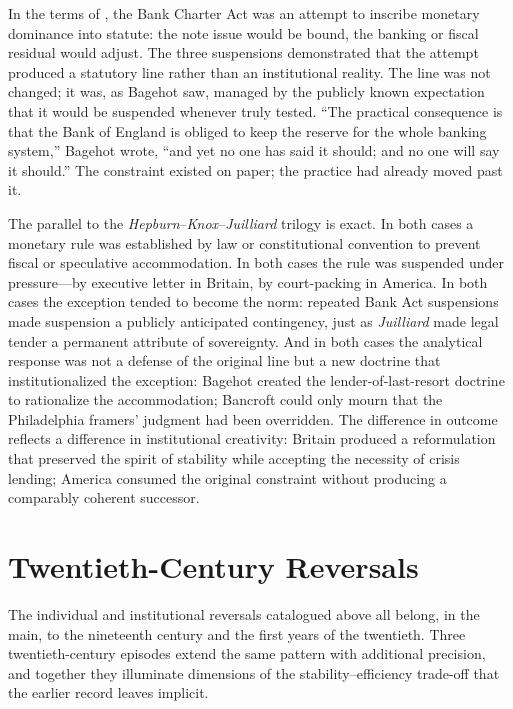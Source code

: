 \documentclass[12pt]{article}
\begin{document}
In the terms of \citet{Sargent2011}, the Bank Charter Act was an attempt
to inscribe monetary dominance into statute: the note issue would be
bound, the banking or fiscal residual would adjust.  The three
suspensions demonstrated that the attempt produced a statutory line
rather than an institutional reality.  The line was not changed; it was,
as Bagehot saw, managed by the publicly known expectation that it would
be suspended whenever truly tested.  ``The practical consequence is
that the Bank of England is obliged to keep the reserve for the whole
banking system,'' Bagehot wrote, ``and yet no one has said it should;
and no one will say it should.''  The constraint existed on paper; the
practice had already moved past it.

The parallel to the \textit{Hepburn}--\textit{Knox}--\textit{Juilliard}
trilogy is exact.  In both cases a monetary rule was established by law
or constitutional convention to prevent fiscal or speculative
accommodation.  In both cases the rule was suspended under pressure---by
executive letter in Britain, by court-packing in America.  In both cases
the exception tended to become the norm: repeated Bank Act suspensions
made suspension a publicly anticipated contingency, just as
\textit{Juilliard} made legal tender a permanent attribute of sovereignty.
And in both cases the analytical response was not a
defense of the original line but a new doctrine that institutionalized
the exception: Bagehot created the lender-of-last-resort doctrine to
rationalize the accommodation; Bancroft could only mourn that the
Philadelphia framers' judgment had been overridden.  The difference in
outcome reflects a difference in institutional creativity: Britain
produced a reformulation that preserved the spirit of stability while
accepting the necessity of crisis lending; America consumed the original
constraint without producing a comparably coherent successor.


\section{Twentieth-Century Reversals}
\label{sec:twentieth}

The individual and institutional reversals catalogued above all belong,
in the main, to the nineteenth century and the first years of the
twentieth.  Three twentieth-century episodes extend the same pattern
with additional precision, and together they illuminate dimensions of
the stability--efficiency trade-off that the earlier record leaves
implicit.
\end{document}
